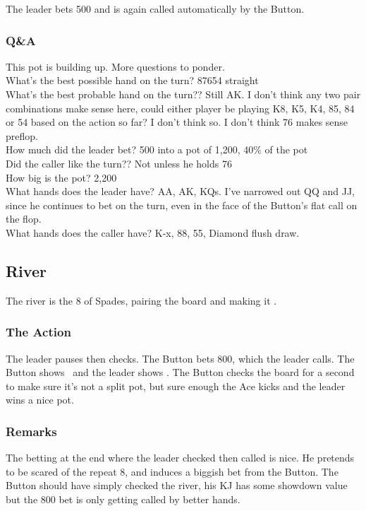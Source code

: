 The leader bets 500 and is again called automatically by
the Button.

\subsubsection*{Q\&A}

This pot is building up. More questions to ponder. \\
What's the best possible hand on the turn? 87654 straight \\
What's the best probable hand on the turn?? Still AK. I don't think any
two pair combinations make sense here, could either player be playing
K8, K5, K4, 85, 84 or 54 based on the action so far? I don't think so. I
don't think 76 makes sense preflop. \\
How much did the leader bet? 500 into a pot of 1,200, 40\% of the pot \\
Did the caller like the turn?? Not unless he holds 76 \\
How big is the pot? 2,200 \\
What hands does the leader have? AA, AK, KQs. I've narrowed out QQ and JJ,
since he continues to bet on the turn, even in the face of the Button's flat
call on the flop. \\
What hands does the caller have? K-x, 88, 55, Diamond flush draw.

\subsection*{River}
The river is the 8 of Spades, pairing the board and making
it \Kc\eigd\fived\fours\eigs.

\subsubsection*{The Action}
The leader pauses then checks. The Button bets 800, which the leader calls.
The Button shows \Kd\Jc\ and the leader shows \As\Ks. The Button
checks the board for a second to make sure it's not a split pot, but
sure enough the Ace kicks and the leader wins a nice pot.

\subsubsection*{Remarks}
The betting at the end where the leader checked then called is nice. He
pretends to be scared of the repeat 8, and induces a biggish bet from the
Button. The Button should have simply checked the river, his KJ has some
showdown value but the 800 bet is only getting called by better hands.


